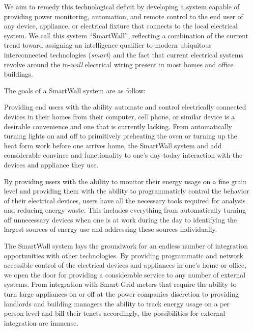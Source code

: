 \documentclass[12pt]{article}
\begin{document}
We aim to remedy this technological deficit
by developing a system capable of providing
power monitoring, automation, and remote control
to the end user of any device, appliance, or electrical fixture that
connects to the local electrical system. We call this system
``SmartWall'', reflecting a combination of the current trend
toward assigning an intelligence qualifier to modern ubiquitous
interconnected technologies (\emph{smart}) and the fact that
current electrical systems
revolve around the in-\emph{wall} electrical wiring present in most homes and
office buildings.

The goals of a SmartWall system are as follow:
\begin{description}
  \setlength{\itemsep}{0pt}
  \setlength{\parskip}{0pt}
  \setlength{\parsep}{0pt}
\item[Convenience:] Providing end users with the ability automate and
  control electrically connected devices in their homes from their
  computer, cell phone, or similar device is a desirable convenience
  and one that is currently lacking. From automatically turning lights
  on and off to primitively preheating the oven or turning up the heat
  form work before one arrives home, the SmartWall system and add
  considerable convince and functionality to one's day-today
  interaction with the devices and appliance they use.
\item[Energy Conservation:] By providing users with the ability to
  monitor their energy usage on a fine grain level and providing them
  with the ability to programmaticly control the behavior of their electrical
  devices, users have all the necessary tools required for analysis
  and reducing energy waste. This includes everything from
  automatically turning off unnecessary devices when one is at work
  during the day to identifying the largest sources of energy use and
  addressing these sources individually.
\item[Integration Framework:] The SmartWall system lays the groundwork for an
  endless number of integration opportunities with other
  technologies. By providing programmatic and network accessible
  control of the electrical devices and appliances in one's home or
  office, we open the door for providing a considerable service to any
  number of external systems. From integration with Smart-Grid meters
  that require the ability to turn large appliances on or off at the
  power companies discretion to providing landlords and building
  managers the ability to track energy usage on a per person level and
  bill their tenets accordingly, the possibilities for external
  integration are immense.
\end{description}
\end{document}
